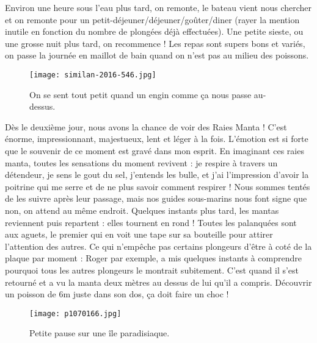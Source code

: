 \documentclass{book}
\begin{document}
Environ une heure sous l'eau plus tard, on remonte, le bateau vient nous chercher et on remonte pour un petit-déjeuner/déjeuner/goûter/diner (rayer la mention inutile en fonction du nombre de plongées déjà effectuées). Une petite sieste, ou une grosse nuit plus tard, on recommence ! Les repas sont supers bons et variés, on passe la journée en maillot de bain quand on n'est pas au milieu des poissons.



\begin{figure}[h]
\centering
\texttt{[image: similan-2016-546.jpg]}
\caption*{On se sent tout petit quand un engin comme ça nous passe au-dessus.}
\end{figure}

Dès le deuxième jour, nous avons la chance de voir des Raies Manta ! C'est énorme, impressionnant, majestueux, lent et léger à la fois. L'émotion est si forte que le souvenir de ce moment est gravé dans mon esprit. En imaginant ces raies manta, toutes les sensations du moment revivent : je respire à travers un détendeur, je sens le gout du sel, j'entends les bulle, et j'ai l'impression d'avoir la poitrine qui me serre et de ne plus savoir comment respirer ! Nous sommes tentés de les suivre après leur passage, mais nos guides sous-marins nous font signe que non, on attend au même endroit. Quelques instants plus tard, les mantas reviennent puis repartent : elles tournent en rond ! Toutes les palanquées sont aux aguets, le premier qui en voit une tape sur sa bouteille pour attirer l'attention des autres. Ce qui n'empêche pas certains plongeurs d'être à coté de la plaque par moment : Roger par exemple, a mis quelques instants à comprendre pourquoi tous les autres plongeurs le montrait subitement. C'est quand il s'est retourné et a vu la manta deux mètres au dessus de lui qu'il a compris. Découvrir un poisson de 6m juste dans son dos, ça doit faire un choc !


\begin{figure}[h]
\centering
\texttt{[image: p1070166.jpg]}
\caption*{Petite pause sur une île paradisiaque.}
\end{figure}
\end{document}
